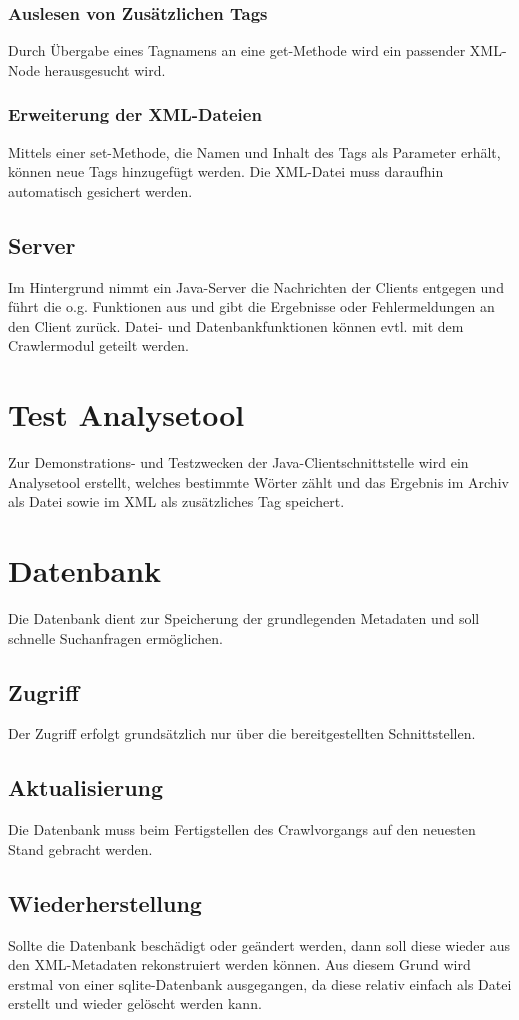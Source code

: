 	\subsubsection{Auslesen von Zusätzlichen Tags} \label{spec:req:jcs:meta:select}
		Durch Übergabe eines Tagnamens an eine get-Methode wird ein passender XML-Node herausgesucht wird.
	\subsubsection{Erweiterung	der XML-Dateien} \label{spec:req:jcs:meta:insert}
		Mittels einer set-Methode, die Namen und Inhalt des Tags als Parameter erhält, können neue Tags hinzugefügt werden.
		Die XML-Datei muss daraufhin automatisch gesichert werden.
\subsection{Server} \label{spec:req:jcs:server}
	Im Hintergrund nimmt ein Java-Server die Nachrichten der Clients entgegen
	und führt die o.g. Funktionen aus und gibt die Ergebnisse oder Fehlermeldungen an den Client zurück.
	Datei- und Datenbankfunktionen können evtl. mit dem Crawlermodul geteilt werden.

\section{Test Analysetool}
	Zur Demonstrations- und Testzwecken der Java-Clientschnittstelle wird ein Analysetool erstellt, welches bestimmte Wörter zählt
	und das Ergebnis im Archiv als Datei sowie im XML als zusätzliches Tag speichert.

\section{Datenbank} \label{spec:req:db}
	Die Datenbank dient zur Speicherung der grundlegenden Metadaten und soll schnelle Suchanfragen ermöglichen.
\subsection{Zugriff}
	Der Zugriff erfolgt grundsätzlich nur über die bereitgestellten Schnittstellen.
\subsection{Aktualisierung} \label{spec:req:db:update}
	Die Datenbank muss beim Fertigstellen des Crawlvorgangs auf den neuesten Stand gebracht werden.
\subsection{Wiederherstellung} \label{spec:req:db:recovery}
	Sollte die Datenbank beschädigt oder geändert werden, dann soll diese wieder aus den
	XML-Metadaten rekonstruiert werden können.
	Aus diesem Grund wird erstmal von einer sqlite-Datenbank ausgegangen, 
	da diese relativ einfach als Datei erstellt und wieder gelöscht werden kann.

